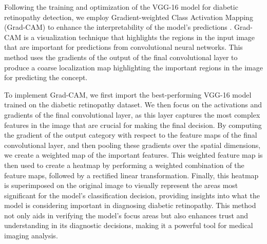 Following the training and optimization of the VGG-16 model for diabetic retinopathy detection, we employ Gradient-weighted Class Activation Mapping (Grad-CAM) to enhance the interpretability of the model’s predictions \cite{selvaraju_grad-cam_2017}. Grad-CAM is a visualization technique that highlights the regions in the input image that are important for predictions from convolutional neural networks. This method uses the gradients of the output of the final convolutional layer to produce a coarse localization map highlighting the important regions in the image for predicting the concept.

To implement Grad-CAM, we first import the best-performing VGG-16 model trained on the diabetic retinopathy dataset. We then focus on the activations and gradients of the final convolutional layer, as this layer captures the most complex features in the image that are crucial for making the final decision. By computing the gradient of the output category with respect to the feature maps of the final convolutional layer, and then pooling these gradients over the spatial dimensions, we create a weighted map of the important features. This weighted feature map is then used to create a heatmap by performing a weighted combination of the feature maps, followed by a rectified linear transformation. Finally, this heatmap is superimposed on the original image to visually represent the areas most significant for the model’s classification decision, providing insights into what the model is considering important in diagnosing diabetic retinopathy. This method not only aids in verifying the model's focus areas but also enhances trust and understanding in its diagnostic decisions, making it a powerful tool for medical imaging analysis.

